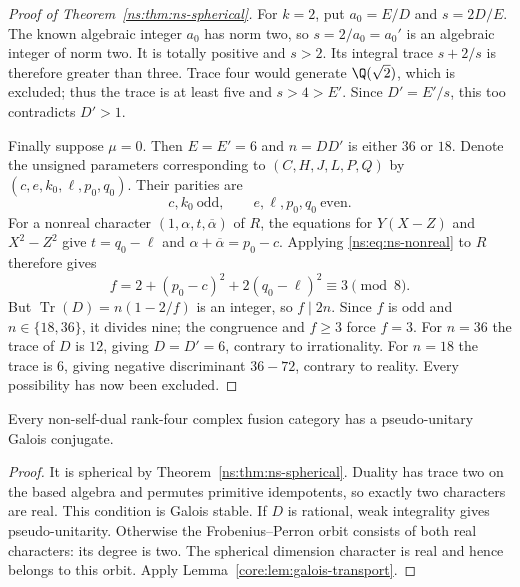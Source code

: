 \begin{proof}[Proof of Theorem~\ref{ns:thm:ns-spherical}]
For $k=2$, put $a_0=E/D$ and $s=2D/E$. The known algebraic integer
$a_0$ has norm two, so $s=2/a_0=a_0'$ is an algebraic integer of
norm two. It is totally positive and $s>2$. Its integral trace
$s+2/s$ is therefore greater than three. Trace four would generate
$\Q(\sqrt2)$, which is excluded; thus the trace is at least
five and $s>4>E'$. Since $D'=E'/s$, this too contradicts $D'>1$.

Finally suppose $\mu=0$. Then $E=E'=6$ and $n=DD'$ is either
$36$ or $18$. Denote the unsigned parameters corresponding to
$(C,H,J,L,P,Q)$ by $(c,e,k_0,\ell,p_0,q_0)$. Their parities are
\[
 c,k_0\ \text{odd},\qquad e,\ell,p_0,q_0\ \text{even}.
\]
For a nonreal character $(1,\alpha,t,\overline\alpha)$ of $R$,
the equations for $Y(X-Z)$ and $X^2-Z^2$ give
$t=q_0-\ell$ and $\alpha+\overline\alpha=p_0-c$.
Applying \eqref{ns:eq:ns-nonreal} to $R$ therefore gives
\[
 f=2+(p_0-c)^2+2(q_0-\ell)^2\equiv3\pmod8.
\]
But $\operatorname{Tr}(D)=n(1-2/f)$ is an integer, so $f\mid2n$.
Since $f$ is odd and $n\in\{18,36\}$, it divides nine; the
congruence and $f\geq3$ force $f=3$. For $n=36$ the trace of $D$
is $12$, giving $D=D'=6$, contrary to irrationality. For $n=18$
the trace is $6$, giving negative discriminant $36-72$,
contrary to reality. Every possibility has now been excluded.
\end{proof}



\begin{corollary}\label{ns:cor:pseudo-unitary-conjugate}
Every non-self-dual rank-four complex fusion category has a
pseudo-unitary Galois conjugate.
\end{corollary}
\begin{proof}
It is spherical by Theorem~\ref{ns:thm:ns-spherical}. Duality has
trace two on the based algebra and permutes primitive idempotents,
so exactly two characters are real. This condition is Galois stable.
If $D$ is rational, weak integrality gives pseudo-unitarity. Otherwise
the Frobenius--Perron orbit consists of both real characters: its
degree is two. The spherical dimension character is real and hence
belongs to this orbit. Apply Lemma~\ref{core:lem:galois-transport}.
\end{proof}

